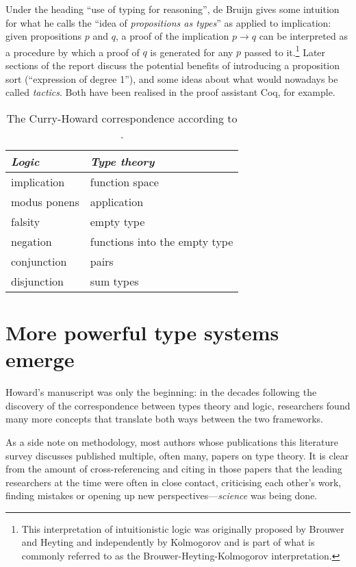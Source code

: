 \documentclass[12pt,toc=bibliography,numbers=noendperiod,
               footnotes=multiple,twoside]{scrartcl}
\begin{document}
Under the heading \enquote{use of typing for reasoning}, de Bruijn gives some intuition for what he calls the \enquote{idea of \emph{propositions as types}} as applied to implication: given propositions \(p\) and \(q\), a proof of the implication \(p \rightarrow q\) can be interpreted as a procedure by which a proof of \(q\) is generated for any \(p\) passed to it.\footnote{This interpretation of intuitionistic logic was originally proposed by Brouwer and Heyting and independently by Kolmogorov and is part of what is commonly referred to as the Brouwer-Heyting-Kolmogorov interpretation.} Later sections of the report discuss the potential benefits of introducing a proposition sort (\enquote{expression of degree 1}), and some ideas about what would nowadays be called \emph{tactics}. Both have been realised in the proof assistant Coq, for example.

\begin{table}[h]
    \centering
    \begin{tabular}{l l}
        \toprule
        \textit{Logic} & \textit{Type theory} \\
        \midrule
	implication & function space \\
	modus ponens & application \\
	falsity & empty type \\
	negation & functions into the empty type \\
	conjunction & pairs \\
	disjunction & sum types \\
        \bottomrule
    \end{tabular}
    \caption{The Curry-Howard correspondence according to \textcite{howard_formulae-as-types_1980}.}
    \label{tab:howard}
\end{table}


\section{\label{sec:power}More powerful type systems emerge}

Howard's manuscript was only the beginning: in the decades following the discovery of the correspondence between types theory and logic, researchers found many more concepts that translate both ways between the two frameworks.

As a side note on methodology, most authors whose publications this literature survey discusses published multiple, often many, papers on type theory. It is clear from the amount of cross-referencing and citing in those papers that the leading researchers at the time were often in close contact, criticising each other's work, finding mistakes or opening up new perspectives---\emph{science} was being done.
\end{document}
